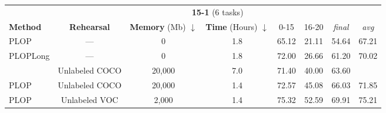 \begin{table*}[t]
    \centering
    \begin{adjustbox}{max width=\textwidth}
        \begin{tabular}{@{}l|ccc|cccc@{}}
            \toprule
                                                           & \multicolumn{7}{c}{\textbf{15-1} (6 tasks)}                                                                                                                                              \\
            \textbf{Method}                                & \textbf{Rehearsal}                          & \textbf{Memory} (Mb) $\downarrow$ & \textbf{Time} (Hours) $\downarrow$ & 0-15           & 16-20          & \textit{final} & \textit{avg}   \\
            \midrule
            PLOP                                           & ---                                         & 0                                 & 1.8                                & 65.12          & 21.11          & 54.64          & 67.21          \\
            PLOPLong                                       & ---                                         & 0                                 & 1.8                                & 72.00          & 26.66          & 61.20          & 70.02          \\
            \hdashline
            \cite{yu2020continualsegmentationselftraining} & Unlabeled COCO                              & 20,000                            & 7.0                                & 71.40          & 40.00          & 63.60          &                \\
            PLOP                                           & Unlabeled COCO                              & 20,000                            & 1.4                                & 72.57          & 45.08          & 66.03          & 71.85          \\
            PLOP                                           & Unlabeled VOC                               & 2,000                             & 1.4                                & 75.32          & 52.59          & 69.91          & 75.21          \\

\end{tabular}
\end{adjustbox}
\end{table*}
